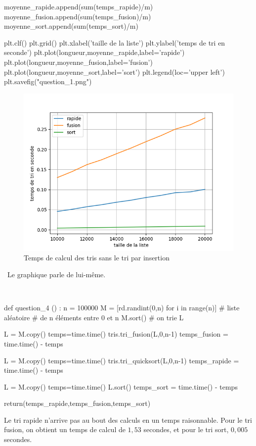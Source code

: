 \begin{corrige}
\begin{python}
        moyenne_rapide.append(sum(temps_rapide)/m)
        moyenne_fusion.append(sum(temps_fusion)/m)
        moyenne_sort.append(sum(temps_sort)/m)

    plt.clf()
    plt.grid()
    plt.xlabel('taille de la liste')
    plt.ylabel('temps de tri en seconde')
    plt.plot(longueur,moyenne_rapide,label='rapide')
    plt.plot(longueur,moyenne_fusion,label='fusion')
    plt.plot(longueur,moyenne_sort,label='sort')
    plt.legend(loc='upper left')
    plt.savefig("question_1.png")
\end{python}



\begin{figure}[H]
\begin{center}
\includegraphics[scale=0.8]{programmes/question_2.png}
\caption{Temps de calcul des tris sans le tri par insertion}
\end{center}
\end{figure}


\question\ Le graphique parle de lui-même.

\question\

\begin{python}
def question_4 () :
    n = 100000
    M = [rd.randint(0,n) for i in range(n)] # liste aléatoire
                                    # de n éléments entre 0 et n
    M.sort() # on trie L

    L = M.copy()                          
    temps=time.time()
    tris.tri_fusion(L,0,n-1)
    temps_fusion = time.time() - temps
            
    L = M.copy() 
    temps=time.time()
    tris.tri_quicksort(L,0,n-1)
    temps_rapide = time.time() - temps
            
    L = M.copy() 
    temps=time.time()
    L.sort()
    temps_sort = time.time() - temps

    return(temps_rapide,temps_fusion,temps_sort)
\end{python}




Le tri rapide n'arrive pas au bout des calculs en un temps raisonnable. Pour le tri fusion, on obtient un temps de 
calcul de $1,53$ secondes, et pour le tri sort, $0,005$ secondes.

\setcounter{question}{0}
\end{corrige}
